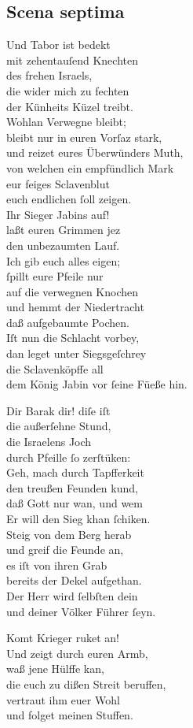 \documentclass{ees}
\newenvironment{lyrics}[1]{%
  \subsection{#1}\nopagebreak%
  \begin{lyricslist}%
  \let\voice\item%
}{%
  \end{lyricslist}%
}
\begin{document}
\begin{lyrics}{Scena septima}
  \voice[Sisera]
  Und Tabor ist bedekt\\
  mit zehentauſend Knechten\\
  des frehen Israels,\\
  die wider mich zu fechten\\
  der Künheits Küzel treibt.\\
  Wohlan Verwegne bleibt;\\
  bleibt nur in euren Vorſaz stark,\\
  und reizet eures Überwünders Muth,\\
  von welchen ein empfündlich Mark\\
  eur feiges Sclavenblut\\
  euch endlichen ſoll zeigen.\\
  Ihr Sieger Jabins auf!\\
  laßt euren Grimmen jez\\
  den unbezaumten Lauf.\\
  Ich gib euch alles eigen;\\
  ſpillt eure Pfeile nur\\
  auf die verwegnen Knochen\\
  und hemmt der Niedertracht\\
  daß aufgebaumte Pochen.\\
  Iſt nun die Schlacht vorbey,\\
  dan leget unter Siegsgeſchrey\\
  die Sclavenköpffe all\\
  dem König Jabin vor ſeine Füeße hin.

  \voice[Debora]
  Dir Barak dir! diſe iſt\\
  die außerſehne Stund,\\
  die Israelens Joch\\
  durch Pfeille ſo zerſtüken:\\
  Geh, mach durch Tapfferkeit\\
  den treußen Feunden kund,\\
  daß Gott nur wan, und wem\\
  Er will den Sieg khan ſchiken.\\
  Steig von dem Berg herab\\
  und greif die Feunde an,\\
  es iſt von ihren Grab\\
  bereits der Dekel aufgethan.\\
  Der Herr wird ſelbſten dein\\
  und deiner Völker Führer ſeyn.

  \voice[Barak]
  Komt Krieger ruket an!\\
  Und zeigt durch euren Armb,\\
  waß jene Hülffe kan,\\
  die euch zu dißen Streit beruffen,\\
  vertraut ihm euer Wohl\\
  und folget meinen Stuffen.
\end{lyrics}
\end{document}
